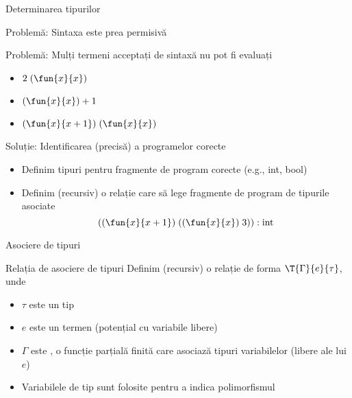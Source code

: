 \documentclass[xcolor=x11names,compress,10pt]{beamer}
\begin{document}
\begin{section}{Determinarea tipurilor}

\begin{frame}{Problemă: Sintaxa este prea permisivă}
    \begin{block}{\alert{Problemă:} Mulți termeni acceptați de sintaxă nu pot fi evaluați}
        \begin{itemize}
        \item $2\;(\fun{x}{x})$
         \item $(\fun{x}{x}) + 1$
        \item $(\fun{x}{x + 1})\; (\fun{x}{x})$
        \end{itemize}
     \end{block}
     \vfill\begin{block}{Soluție:  Identificarea (precisă) a programelor corecte}
     \begin{itemize}
     \item Definim tipuri pentru fragmente de program corecte (e.g., int, bool)
     \item Definim (recursiv) o relație care să lege fragmente de program de tipurile asociate
     \[((\fun{x}{x + 1})\; ((\fun{x}{x})\; 3)) : \mbox{int}\]
     \end{itemize}
     \end{block}
\end{frame}


    \begin{subsection}{Asociere de tipuri}
    \begin{frame}{Relația de asociere de tipuri}
    Definim (recursiv) o relație de forma $\T{\Gamma}{e}{\tau}$, unde
    \begin{itemize}
    \item $\tau$ este un tip
    
    \vspace{-2ex}
    \begin{syntaxBlock}{\structure{\tau}}
    \vspace{-4ex}
    \end{syntaxBlock}
    \item $e$ este un termen (potențial cu variabile libere)
    \item $\Gamma$ este , o funcție parțială finită care asociază tipuri variabilelor (libere ale lui $e$)
    \item Variabilele de tip sunt folosite pentru a indica polimorfismul
    \end{itemize}
    

\end{frame}
\end{subsection}
\end{section}
\end{document}
